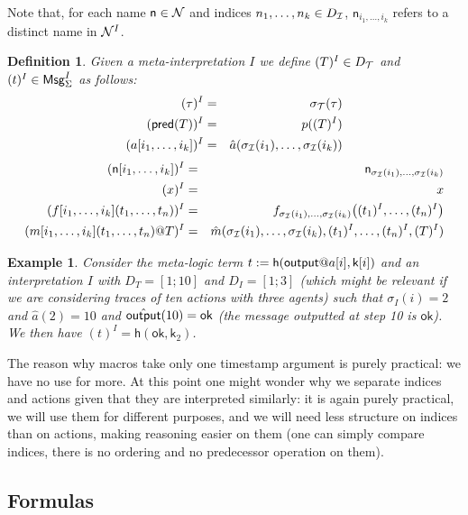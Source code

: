 \documentclass[a4paper]{article}
\newtheorem{definition}{Definition}
\newtheorem{example}{Example}
\theoremstyle{remark}
\begin{document}
Note that, for each name $\mathsf{n}\in \mathcal{N}$ and indices $n_1,\ldots,n_k \in 
D_{\mathcal{I}}$, $\mathsf{n}_{i_1,\ldots,i_k}$ refers to a distinct name in $\mathcal{N}^I$.

\begin{definition}
  Given a meta-interpretation $I$
  we define $(T)^{I} \in D_{\mathcal{T}}$ and $(t)^{I} \in \mathsf{Msg}^I_\Sigma$ as follows:
  \begin{eqnarray*}
    (\tau)^{I} &=& \sigma_{\mathcal{T}}(\tau) \\
    (\textsf{pred}(T))^{I} &=& p((T)^{I}) \\
    (a[i_1,\ldots,i_k])^{I} &=& \hat{a}(\sigma_{\mathcal{I}}(i_1),\ldots,\sigma_{\mathcal{I}}(i_k))
  \end{eqnarray*}
  \begin{eqnarray*}
    (\mathsf{n}[i_1,\ldots,i_k])^{I} &=& \mathsf{n}_{\sigma_{\mathcal{I}}(i_1),\ldots,\sigma_{\mathcal{I}}(i_k)}
    \\
    (x)^{I} &=& x
    \\
    (f[i_1,\ldots,i_k](t_1,\ldots,t_n))^{I} &=&
    f_{\sigma_{\mathcal{I}}(i_1),\ldots,\sigma_{\mathcal{I}}(i_k)}\bigl(
      (t_1)^{I},\ldots,(t_n)^{I}
    \bigr)
    \\
    (m[i_1,\ldots,i_k](t_1,\ldots,t_n)@T)^{I} &=&
    \hat{m}(\sigma_{\mathcal{I}}(i_1),\ldots,\sigma_{\mathcal{I}}(i_k),
      (t_1)^{I},\ldots,(t_n)^{I},
      (T)^{I})
  \end{eqnarray*}
\end{definition}

\begin{example}
  Consider the meta-logic term $t := \mathsf{h}(\mout@a[i],\mathsf{k}[i])$
  and an interpretation $I$ with $D_T = [1;10]$ and $D_I = [1;3]$
  (which might be relevant if we are considering traces of ten actions
  with three agents) such that $\sigma_I(i)=2$ and $\hat{a}(2)=10$
  and $\hat{\textsf{output}}(10)=\mathsf{ok}$ (the message outputted at step 10
  is $\mathsf{ok}$).
  We then have $(t)^I = \mathsf{h}(\mathsf{ok},\mathsf{k}_2)$.
\end{example}

The reason why macros take only one timestamp argument is purely practical:
we have no use for more. At this point one might wonder why we separate 
indices and actions given that they are interpreted similarly: it is again
purely practical, we will use them for different purposes, and we will need
less structure on indices than on actions, making reasoning easier on them
(one can simply compare indices, there is no ordering and no predecessor
operation on them).

\subsection{Formulas}
\end{document}

